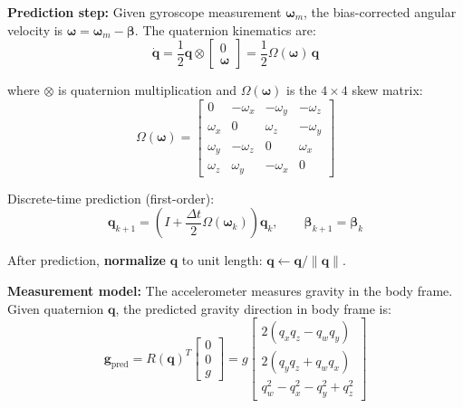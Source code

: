 \textbf{Prediction step:} Given gyroscope measurement $\boldsymbol{\omega}_m$, the bias-corrected angular velocity is $\boldsymbol{\omega} = \boldsymbol{\omega}_m - \boldsymbol{\beta}$. The quaternion kinematics are:
\begin{equation}
\dot{\mathbf{q}} = \frac{1}{2}\mathbf{q} \otimes \begin{bmatrix} 0 \\ \boldsymbol{\omega} \end{bmatrix}
= \frac{1}{2}\Omega(\boldsymbol{\omega})\,\mathbf{q}
\end{equation}

where $\otimes$ is quaternion multiplication and $\Omega(\boldsymbol{\omega})$ is the $4\times 4$ skew matrix:
\begin{equation}
\Omega(\boldsymbol{\omega}) = \begin{bmatrix}
0 & -\omega_x & -\omega_y & -\omega_z \\
\omega_x & 0 & \omega_z & -\omega_y \\
\omega_y & -\omega_z & 0 & \omega_x \\
\omega_z & \omega_y & -\omega_x & 0
\end{bmatrix}
\end{equation}

Discrete-time prediction (first-order):
\begin{equation}
\mathbf{q}_{k+1} = \left(I + \frac{\Delta t}{2}\Omega(\boldsymbol{\omega}_k)\right)\mathbf{q}_k, \qquad
\boldsymbol{\beta}_{k+1} = \boldsymbol{\beta}_k
\end{equation}

After prediction, \textbf{normalize} $\mathbf{q}$ to unit length: $\mathbf{q} \leftarrow \mathbf{q}/\|\mathbf{q}\|$.

\textbf{Measurement model:} The accelerometer measures gravity in the body frame. Given quaternion $\mathbf{q}$, the predicted gravity direction in body frame is:
\begin{equation}
\mathbf{g}_{\text{pred}} = R(\mathbf{q})^T \begin{bmatrix} 0 \\ 0 \\ g \end{bmatrix}
= g\begin{bmatrix}
2(q_x q_z - q_w q_y) \\
2(q_y q_z + q_w q_x) \\
q_w^2 - q_x^2 - q_y^2 + q_z^2
\end{bmatrix}
\end{equation}

